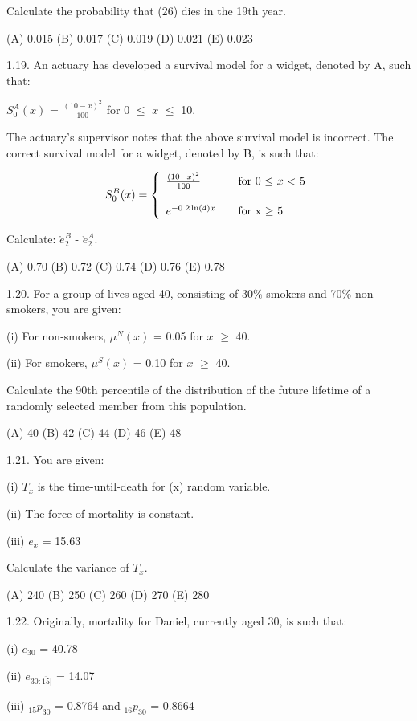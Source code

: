 \documentclass[]{book}
\begin{document}
Calculate the probability that (26) dies in the 19th year.

(A) 0.015 (B) 0.017 (C) 0.019 (D) 0.021 (E) 0.023

1.19. An actuary has developed a survival model for a widget, denoted by
A, such that:

\(S^A_0(x)\) = \(\frac{(10 - x)^2}{100}\) for 0 \(\le\) \(x\) \(\le\)
10.

The actuary's supervisor notes that the above survival model is
incorrect. The correct survival model for a widget, denoted by B, is
such that:

\[S^B_0(x) = \left\{
  \begin{array}{l l }
    \frac{(10 - x)^2}{100}       & \quad \text{for 0 $\le$ $x$ $<$
    5} \vspace{5mm}\\
  e^{- 0.2\ln(4) x}            & \quad \text{for x $\ge$ 5}\\
  \end{array} \right.\]

Calculate: \(\mathring{e}^B_2\) - \(\mathring{e}^A_2\).

(A) 0.70 (B) 0.72 (C) 0.74 (D) 0.76 (E) 0.78

1.20. For a group of lives aged 40, consisting of 30\% smokers and 70\%
non-smokers, you are given:

(i) For non-smokers, \(\mu^N(x)\) = 0.05 for \(x\) \(\ge\) 40.

(ii) For smokers, \(\mu^S(x)\) = 0.10 for \(x\) \(\ge\) 40.

Calculate the 90th percentile of the distribution of the future lifetime
of a randomly selected member from this population.

(A) 40 (B) 42 (C) 44 (D) 46 (E) 48

1.21. You are given:

(i) \(T_x\) is the time-until-death for (x) random variable.

(ii) The force of mortality is constant.

(iii) \(e_x\) = 15.63

Calculate the variance of \(T_x\).

(A) 240 (B) 250 (C) 260 (D) 270 (E) 280

1.22. Originally, mortality for Daniel, currently aged 30, is such that:

(i) \(e_{30}\) = 40.78

(ii) \(e_{30 :\overline{15}|}\) = 14.07

(iii) \({}_{15}p_{30}\) = 0.8764 and \({}_{16}p_{30}\) = 0.8664
\end{document}
